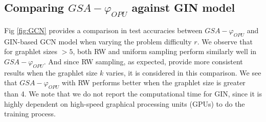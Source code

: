 \documentclass{article}
\begin{document}
\subsection{Comparing $GSA-\varphi_{OPU}$ against GIN model}\label{sec:vs_GIN}

Fig \ref{fig:GCN} provides a comparison in test accuracies between $GSA-\varphi_{OPU}$ and  GIN-based GCN model when varying the problem difficulty $r$. We observe that for graphlet sizes $>5$, both RW and uniform sampling perform similarly well in $GSA-\varphi_{OPU}$. And since RW sampling, as expected, provide more consistent results when the graphlet size $k$ varies, it is considered in this comparison.
We see that $GSA-\varphi_{OPU}$ with RW  performs better when the graphlet size is greater than 4. We note that we do not report the computational time for GIN, since it is highly dependent on high-speed graphical processing units (GPUs) to do the training process.
\end{document}
